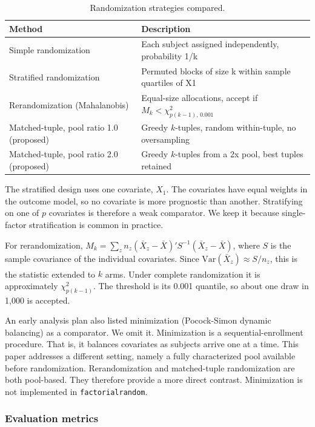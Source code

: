 \documentclass[
  11pt,
]{article}
\begin{document}
\begin{table}[!h]
\centering
\caption{\label{tab:comparators}Randomization strategies compared.}
\centering
\fontsize{10}{12}\selectfont
\begin{tabular}[t]{ll}
\toprule
Method & Description\\
\midrule
Simple randomization & Each subject assigned independently, probability 1/k\\
Stratified randomization & Permuted blocks of size k within sample quartiles of X1\\
Rerandomization (Mahalanobis) & Equal-size allocations, accept if $M_k < \chi^2_{p(k-1),\,0.001}$\\
Matched-tuple, pool ratio 1.0 (proposed) & Greedy $k$-tuples, random within-tuple, no oversampling\\
Matched-tuple, pool ratio 2.0 (proposed) & Greedy $k$-tuples from a 2x pool, best tuples retained\\
\bottomrule
\end{tabular}
\end{table}

The stratified design uses one covariate, \(X_1\). The
covariates have equal weights in the outcome model, so no
covariate is more prognostic than another. Stratifying on
one of \(p\) covariates is therefore a weak comparator. We
keep it because single-factor stratification is common in
practice.

For rerandomization, \(M_k = \sum_z n_z (\bar{X}_z -
\bar{X})' S^{-1} (\bar{X}_z - \bar{X})\), where \(S\) is the
sample covariance of the individual covariates. Since
\(\text{Var}(\bar{X}_z) \approx S/n_z\), this is the\textsuperscript{} statistic extended to \(k\) arms.
Under complete randomization it is approximately
\(\chi^2_{p(k-1)}\). The threshold is its 0.001 quantile, so
about one draw in 1,000 is accepted.

An early analysis plan also listed minimization
(Pocock-Simon dynamic balancing) as a comparator. We omit
it. Minimization is a sequential-enrollment procedure. That
is, it balances covariates as subjects arrive one at a
time. This paper addresses a different setting, namely a
fully characterized pool available before randomization.
Rerandomization and matched-tuple randomization are both
pool-based. They therefore provide a more direct contrast.
Minimization is not implemented in \texttt{factorialrandom}.

\subsubsection{Evaluation metrics}\label{evaluation-metrics}
\end{document}
